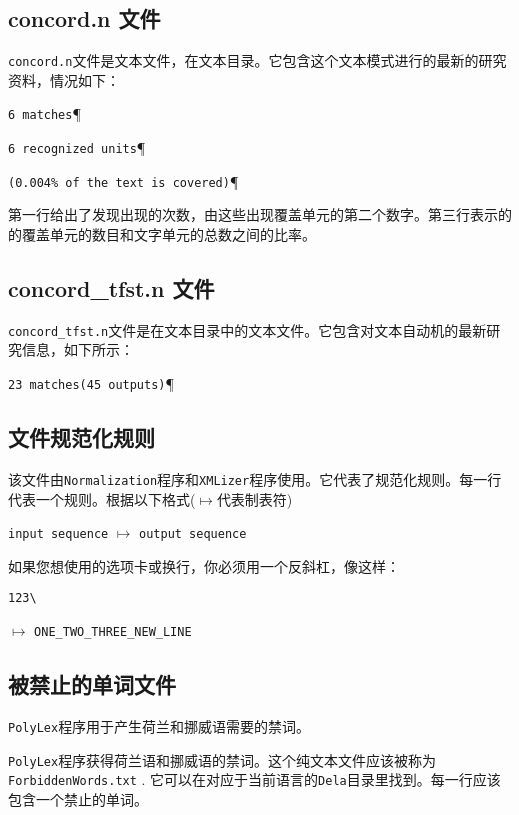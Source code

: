 \subsection{concord.n 文件}
\verb+concord.n+文件是文本文件，在文本目录。它包含这个文本模式进行的最新的研究资料，情况如下：

\bigskip
\verb$6 matches$\P

\verb$6 recognized units$\P

\verb$(0.004% of the text is covered)$\P

\bigskip
\noindent 
第一行给出了发现出现的次数，由这些出现覆盖单元的第二个数字。第三行表示的的覆盖单元的数目和文字单元的总数之间的比率。

\subsection{ concord\_tfst.n 文件}
\verb+concord_tfst.n+文件是在文本目录中的文本文件。它包含对文本自动机的最新研究信息，如下所示：

\bigskip
\verb$23 matches(45 outputs)$\P



\subsection{文件规范化规则}
\label{section-normalization-file}
该文件由\verb+Normalization+程序和\verb+XMLizer+程序使用。它代表了规范化规则。每一行代表一个规则。根据以下格式($\longmapsto$代表制表符)

\bigskip
\noindent \verb+input sequence+ $\longmapsto$ \verb+output sequence+

\bigskip
\noindent 
如果您想使用的选项卡或换行，你必须用一个反斜杠，像这样：

\bigskip
\noindent
\verb+123\+

\noindent
$\longmapsto$ \verb+ONE_TWO_THREE_NEW_LINE+



\subsection{被禁止的单词文件}
 \label{section-forbidden-words}
\verb+PolyLex+程序用于产生荷兰和挪威语需要的禁词。


\verb+PolyLex+程序获得荷兰语和挪威语的禁词。这个纯文本文件应该被称为 \verb+ForbiddenWords.txt+
. 
它可以在对应于当前语言的\verb+Dela+目录里找到。每一行应该包含一个禁止的单词。

